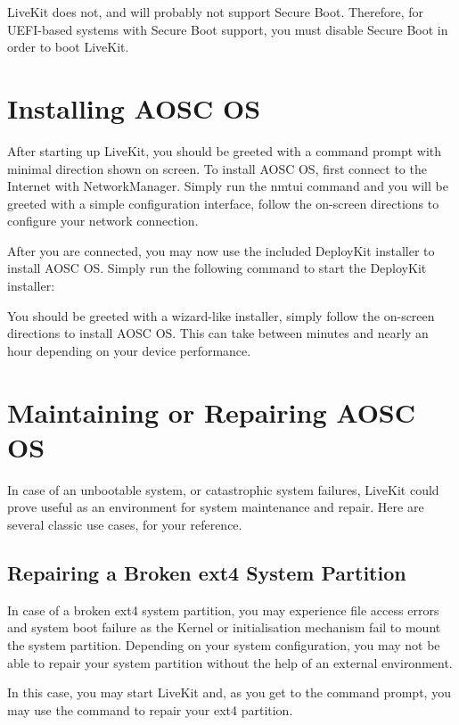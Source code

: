 \documentclass[a5paper,twosided,11pt]{book}
\begin{document}
    LiveKit does not, and will probably not support Secure Boot.
    Therefore, for UEFI-based systems with Secure Boot support,
    you must disable Secure Boot in order to boot LiveKit.

    \section{Installing AOSC OS}
    
    After starting up LiveKit, you should be greeted with a command prompt with minimal direction shown on screen. To install AOSC OS, first connect to the Internet with NetworkManager. Simply run the nmtui command and you will be greeted with a simple configuration interface, follow the on-screen directions to configure your network connection.

    After you are connected, you may now use the included DeployKit installer to install AOSC OS. Simply run the following command to start the DeployKit installer:


    You should be greeted with a wizard-like installer, simply follow the on-screen directions to install AOSC OS. This can take between minutes and nearly an hour depending on your device performance.
    
    
    \section{Maintaining or Repairing AOSC OS}

    In case of an unbootable system, or catastrophic system failures, LiveKit could prove useful as an environment for system maintenance and repair. Here are several classic use cases, for your reference.

    \subsection{Repairing a Broken ext4 System Partition}

    In case of a broken ext4 system partition, you may experience file access errors and system boot failure
    as the Kernel or initialisation mechanism fail to mount the system partition.
    Depending on your system configuration, you may not be able to repair your system partition
    without the help of an external environment.

    In this case, you may start LiveKit and, as you get to the command prompt,
    you may use the  command to repair your ext4 partition.
\end{document}
